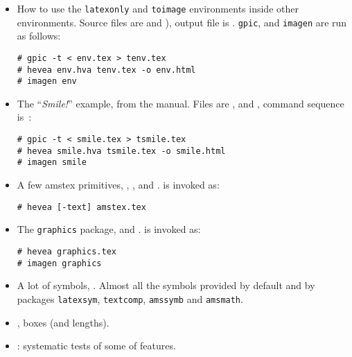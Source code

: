\documentclass{article}
\begin{document}
\begin{itemize}
\item How to use the \verb+latexonly+ and \verb+toimage+ environments
inside other environments.
Source files are  and
), output file is .
\texttt{gpic}, \hevea{} and \texttt{imagen}
are run as follows:
\begin{verbatim}
# gpic -t < env.tex > tenv.tex
# hevea env.hva tenv.tex -o env.html
# imagen env
\end{verbatim}

\item The ``\emph{Smile!}'' example, from the manual.
Files are ,  and
, command sequence is~:
\begin{verbatim}
# gpic -t < smile.tex > tsmile.tex
# hevea smile.hva tsmile.tex -o smile.html
# imagen smile
\end{verbatim}

\item A few amstex primitives, ,
,  and .
\hevea{} is invoked as:
\begin{verbatim}
# hevea [-text] amstex.tex
\end{verbatim}

\item The \texttt{graphics} package, 
and .
\hevea{} is invoked as:
\begin{verbatim}
# hevea graphics.tex
# imagen graphics
\end{verbatim} 

\item A lot of symbols, .
Almost all the symbols provided by default and by packages
\texttt{latexsym},
\texttt{textcomp},
\texttt{amssymb} and \texttt{amsmath}.

\item {}, boxes (and lengths).

\item {}: systematic tests of some of \hevea{} features.
\end{itemize}
\end{document}
